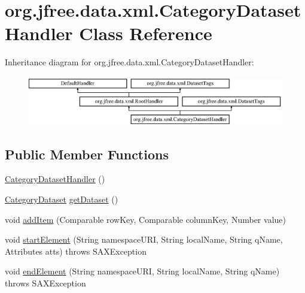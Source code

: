 \hypertarget{classorg_1_1jfree_1_1data_1_1xml_1_1_category_dataset_handler}{}\section{org.\+jfree.\+data.\+xml.\+Category\+Dataset\+Handler Class Reference}
\label{classorg_1_1jfree_1_1data_1_1xml_1_1_category_dataset_handler}
Inheritance diagram for org.\+jfree.\+data.\+xml.\+Category\+Dataset\+Handler\+:\begin{figure}[H]
\begin{center}
\leavevmode
\includegraphics[height=2.137405cm]{classorg_1_1jfree_1_1data_1_1xml_1_1_category_dataset_handler}
\end{center}
\end{figure}
\subsection*{Public Member Functions}
\begin{DoxyCompactItemize}
\item 
\mbox{\hyperlink{classorg_1_1jfree_1_1data_1_1xml_1_1_category_dataset_handler_a970502a7919325ccdca36f464d33f731}{Category\+Dataset\+Handler}} ()
\item 
\mbox{\hyperlink{interfaceorg_1_1jfree_1_1data_1_1category_1_1_category_dataset}{Category\+Dataset}} \mbox{\hyperlink{classorg_1_1jfree_1_1data_1_1xml_1_1_category_dataset_handler_afc6b3ff610024ad772c8f0efa003128e}{get\+Dataset}} ()
\item 
void \mbox{\hyperlink{classorg_1_1jfree_1_1data_1_1xml_1_1_category_dataset_handler_a71693f1d5fafd2ec831d8325c1274a7a}{add\+Item}} (Comparable row\+Key, Comparable column\+Key, Number value)
\item 
void \mbox{\hyperlink{classorg_1_1jfree_1_1data_1_1xml_1_1_category_dataset_handler_a359a6db4dceb1e108bce371c81c9aad1}{start\+Element}} (String namespace\+U\+RI, String local\+Name, String q\+Name, Attributes atts)  throws S\+A\+X\+Exception 
\item 
void \mbox{\hyperlink{classorg_1_1jfree_1_1data_1_1xml_1_1_category_dataset_handler_ae31a74277ba689a940f6b698b0475cbe}{end\+Element}} (String namespace\+U\+RI, String local\+Name, String q\+Name)  throws S\+A\+X\+Exception 
\end{DoxyCompactItemize}
